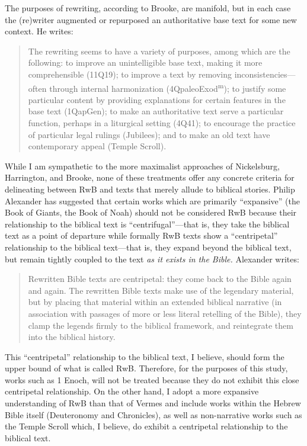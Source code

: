 The purposes of rewriting, according to Brooke, are manifold, but in
each case the (re)writer augmented or repurposed an authoritative base
text for some new context. He writes:

\begin{quote}
The rewriting seems to have a variety of purposes, among which are the
following: to improve an unintelligible base text, making it more
comprehensible (11Q19); to improve a text by removing
inconsistencies---often through internal harmonization
(4QpaleoExod\textsuperscript{m}); to justify some particular content by
providing explanations for certain features in the base text (1QapGen);
to make an authoritative text serve a particular function, perhaps in a
liturgical setting (4Q41); to encourage the practice of particular legal
rulings (Jubilees); and to make an old text have contemporary appeal
(Temple Scroll).\autocite[778]{brooke_schiffman-vanderkam2000}
\end{quote}

While I am sympathetic to the more maximalist approaches of Nickelsburg,
Harrington, and Brooke, none of these treatments offer any concrete
criteria for delineating between RwB and texts that merely allude to
biblical stories. Philip Alexander has suggested that certain works
which are primarily ``expansive'' (the Book of Giants, the Book of Noah)
should not be considered RwB because their relationship to the biblical
text is ``centrifugal''---that is, they take the biblical text as a
point of departure while formally RwB texts show a ``centripetal''
relationship to the biblical text---that is, they expand beyond the
biblical text, but remain tightly coupled to the text \emph{as it exists
in the Bible.} Alexander writes:

\begin{quote}
Rewritten Bible texts are centripetal: they come back to the Bible again
and again. The rewritten Bible texts make use of the legendary material,
but by placing that material within an extended biblical narrative (in
association with passages of more or less literal retelling of the
Bible), they clamp the legends firmly to the biblical framework, and
reintegrate them into the biblical history.
\autocite[117]{alexander_carson-williamson1988}
\end{quote}

This ``centripetal'' relationship to the biblical text, I believe,
should form the upper bound of what is called RwB. Therefore, for the
purposes of this study, works such as 1 Enoch, will not be treated
because they do not exhibit this close centripetal relationship. On the
other hand, I adopt a more expansive understanding of RwB than that of
Vermes and include works within the Hebrew Bible itself (Deuteronomy and
Chronicles), as well as non-narrative works such as the Temple Scroll
which, I believe, do exhibit a centripetal relationship to the biblical
text.

